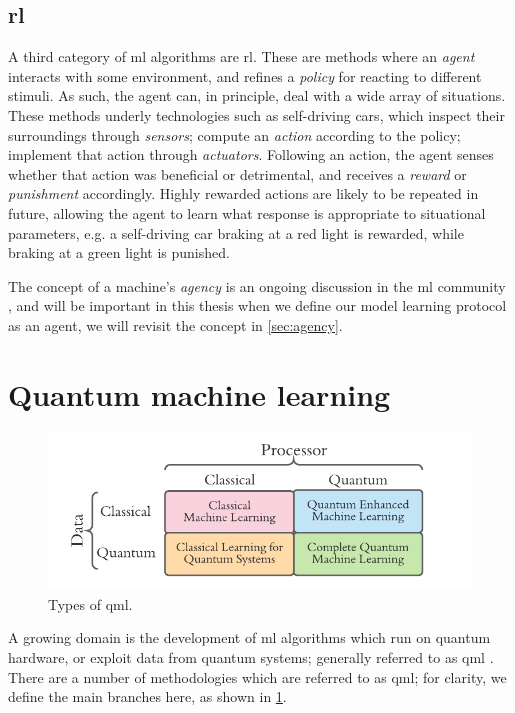 \subsection{\Acrlong{rl}}
A third category of \gls{ml} algorithms are \acrfull{rl}. 
These are methods where an \emph{agent} interacts with some environment, 
    and refines a \emph{policy} for reacting to different stimuli. 
As such, the agent can, in principle, deal with a wide array of situations. 
These methods underly technologies such as self-driving cars, 
    which inspect their surroundings through \emph{sensors};
    compute an \emph{action} according to the policy; 
    implement that action through \emph{actuators}.
Following an action, the agent senses whether that action was beneficial or detrimental, 
    and receives a \emph{reward} or \emph{punishment} accordingly. 
Highly rewarded actions are likely to be repeated in future, allowing the agent to learn what response is 
    appropriate to situational parameters, 
    e.g. a self-driving car braking at a red light is rewarded, 
    while braking at a green light is punished. 
\par 
The concept of a machine's \emph{agency} is an ongoing discussion in the \gls{ml} community \cite{franklin1996agent, wooldridge2009introduction}, 
    and will be important in this thesis when we define our model learning protocol as an agent, 
    we will revisit the concept in \cref{sec:agency}.

\section{Quantum machine learning}
\begin{figure}
    \begin{center}
        \includegraphics{contextual_review/figures/qml_types.pdf}
    \end{center}
    \caption[Types of quantum machine learning]{Types of \acrlong{qml}.}
    \label{fig:qml_types}
\end{figure}
A growing domain is the development of \gls{ml} algorithms which run on quantum hardware, 
    or exploit data from quantum systems; generally referred to as \acrfull{qml} \cite{biamonte2017quantum, adcock2015advances}. 
There are a number of methodologies which are referred to as \gls{qml};
    for clarity, we define the main branches here, as shown in \cref{fig:qml_types}. 

